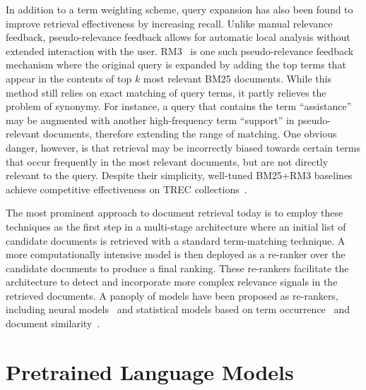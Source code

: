 In addition to a term weighting scheme, query expansion has also been found to improve retrieval effectiveness by increasing recall.
Unlike manual relevance feedback, pseudo-relevance feedback allows for automatic local analysis without extended interaction with the user.
RM3~\cite{lavrenko2017relevance} is one such pseudo-relevance feedback mechanism where the original query is expanded by adding the top terms that appear in the contents of top $ k $ most relevant BM25 documents.
While this method still relies on exact matching of query terms, it partly relieves the problem of synonymy.
For instance, a query that contains the term ``assistance'' may be augmented with another high-frequency term ``support'' in pseudo-relevant documents, therefore extending the range of matching.
One obvious danger, however, is that retrieval may be incorrectly biased towards certain terms that occur frequently in the most relevant documents, but are not directly relevant to the query.
Despite their simplicity, well-tuned BM25+RM3 baselines achieve competitive effectiveness on TREC collections~\cite{lin2019neural}.


The most prominent approach to document retrieval today is to employ these techniques as the first step in a multi-stage architecture where an initial list of candidate documents is retrieved with a standard term-matching technique.
A more computationally intensive model is then deployed as a re-ranker over the candidate documents to produce a final ranking.
These re-rankers facilitate the architecture to detect and incorporate more complex relevance signals in the retrieved documents.
A panoply of models have been proposed as re-rankers, including neural models~\cite{dehghani2017neural} and statistical models based on term occurrence~\cite{lingpeng2004document} and document similarity~\cite{lee2001re, balinski2005re}.

\section{Pretrained Language Models}
\label{lm}

